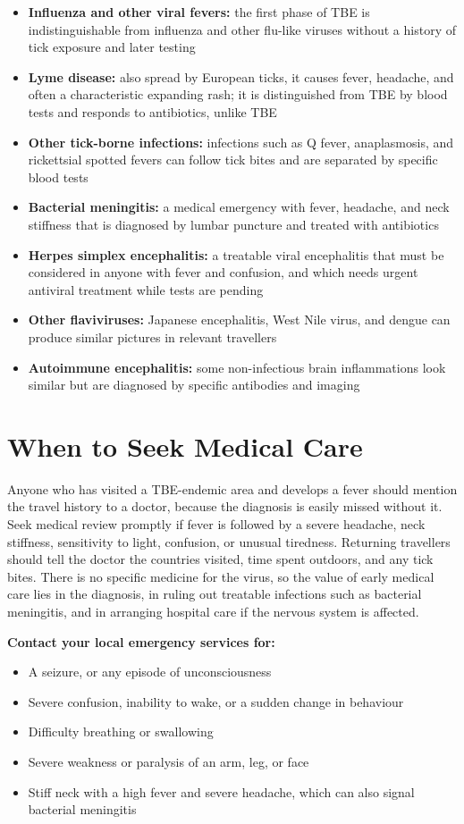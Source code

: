 \begin{itemize}
    \item \textbf{Influenza and other viral fevers:} the first phase of TBE is indistinguishable from influenza and other flu-like viruses without a history of tick exposure and later testing
    \item \textbf{Lyme disease:} also spread by European ticks, it causes fever, headache, and often a characteristic expanding rash; it is distinguished from TBE by blood tests and responds to antibiotics, unlike TBE
    \item \textbf{Other tick-borne infections:} infections such as Q fever, anaplasmosis, and rickettsial spotted fevers can follow tick bites and are separated by specific blood tests
    \item \textbf{Bacterial meningitis:} a medical emergency with fever, headache, and neck stiffness that is diagnosed by lumbar puncture and treated with antibiotics
    \item \textbf{Herpes simplex encephalitis:} a treatable viral encephalitis that must be considered in anyone with fever and confusion, and which needs urgent antiviral treatment while tests are pending
    \item \textbf{Other flaviviruses:} Japanese encephalitis, West Nile virus, and dengue can produce similar pictures in relevant travellers
    \item \textbf{Autoimmune encephalitis:} some non-infectious brain inflammations look similar but are diagnosed by specific antibodies and imaging
\end{itemize}

\section*{When to Seek Medical Care}
Anyone who has visited a TBE-endemic area and develops a fever should mention the travel history to a doctor, because the diagnosis is easily missed without it. Seek medical review promptly if fever is followed by a severe headache, neck stiffness, sensitivity to light, confusion, or unusual tiredness. Returning travellers should tell the doctor the countries visited, time spent outdoors, and any tick bites. There is no specific medicine for the virus, so the value of early medical care lies in the diagnosis, in ruling out treatable infections such as bacterial meningitis, and in arranging hospital care if the nervous system is affected.

\textbf{Contact your local emergency services for:}
\begin{itemize}
    \item A seizure, or any episode of unconsciousness
    \item Severe confusion, inability to wake, or a sudden change in behaviour
    \item Difficulty breathing or swallowing
    \item Severe weakness or paralysis of an arm, leg, or face
    \item Stiff neck with a high fever and severe headache, which can also signal bacterial meningitis
\end{itemize}

